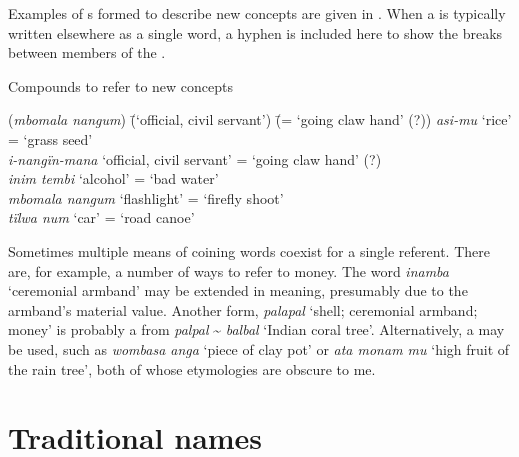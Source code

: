 Examples of s formed to describe new concepts are given in . When a  is typically written elsewhere as a single  word, a hyphen is included here to show the breaks between members of the .

\ea%
    \label{ex:sem:35}
          Compounds to refer to new concepts
\begin{tabbing}
{(\textit{mbomala nangum})} \= {(‘official, civil servant’)} \= {(= ‘going claw hand’ (?))}\kill
{\textit{asi-mu}} \> {‘rice’} \> {= ‘grass seed’}\\
{\textit{i-nangïn-mana}} \> {‘official, civil servant’} \> {= ‘going claw hand’ (?)\footnotemark}\\
{\textit{inim tembi}} \> {‘alcohol’} \> {= ‘bad water’}\\
{\textit{mbomala nangum}} \> {‘flashlight’} \> {= ‘firefly shoot’}\\
{\textit{tïlwa num}} \> {‘car’} \> {= ‘road canoe’\footnotemark}
\end{tabbing}
\z
{}

Sometimes multiple means of coining words coexist for a single referent. There are, for example, a number of ways to refer to money. The word \textit{inamba} ‘ceremonial armband’ may be extended in meaning, presumably due to the armband’s material value. Another form, \textit{palapal} ‘shell; ceremonial armband; money’ is probably a  from  \textit{palpal} {\textasciitilde} \textit{balbal} ‘Indian coral tree’. Alternatively, a  may be used, such as \textit{wombasa anga} ‘piece of clay pot’ or \textit{ata monam mu} ‘high fruit of the rain tree’, both of whose etymologies are obscure to me.



\section{{Traditional} {names}}\label{sec:14.10}


